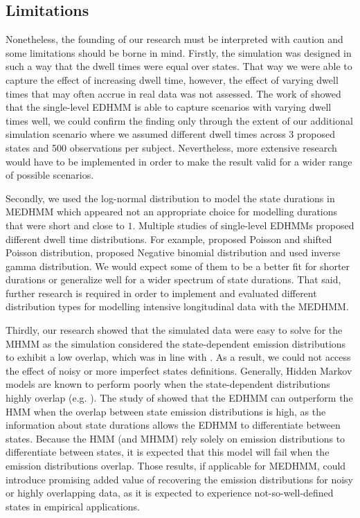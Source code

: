 \subsection{Limitations}
Nonetheless, the founding of our research must be interpreted with caution and some limitations should be borne in mind.
Firstly, the simulation was designed in such a way that the dwell times were equal over states. That way we were able to capture the effect of increasing dwell time, however, the effect of varying dwell times that may often accrue in real data was not assessed. The work of \cite{Ruiz_Suarez_2022} showed that the single-level EDHMM is able to capture scenarios with varying dwell times well, we could confirm the finding only through the extent of our additional simulation scenario where we assumed  different dwell times across 3 proposed states and 500 observations per subject. Nevertheless, more extensive research would have to be implemented in order to make the result valid for a wider range of possible scenarios. 

Secondly, we used the log-normal distribution to model the state durations in MEDHMM which appeared not an appropriate choice for modelling durations that were short and close to $1$. Multiple studies of single-level EDHMMs proposed different dwell time distributions. For example, \cite{hadjamar2022bayesian,dewar_inference_2012,LUATI2021107183} proposed Poisson and shifted Poisson distribution, \cite{hadjamar2022bayesian,POHLE2022107479} proposed Negative binomial distribution and \cite{Nagaraja_1996} used inverse gamma distribution. We would expect some of them to be a better fit for shorter durations or generalize well for a wider spectrum of state durations. That said, further research is required in order to implement and evaluated different distribution types for modelling intensive longitudinal data with the MEDHMM. 

Thirdly, our research showed that the simulated data were easy to solve for the MHMM as the simulation considered the state-dependent emission distributions to exhibit a low overlap, which was in line with \cite{McClintock_2021}. As a result, we could not access the effect of noisy or more imperfect states definitions. Generally, Hidden Markov models are known to perform poorly when the state-dependent distributions highly overlap (e.g. \cite{jonsen2016joint,Beyer_Morales_Murray_Fortin_2013}). The study of \cite{Ruiz_Suarez_2022} showed that the EDHMM can outperform the HMM when the overlap between state emission distributions is high, as the information about state durations allows the EDHMM to differentiate between states.  Because the HMM (and MHMM) rely solely on emission distributions to differentiate between states, it is expected that this model will fail when the emission distributions overlap. Those results, if applicable for MEDHMM, could introduce promising added value of recovering the emission distributions for noisy or highly overlapping data, as it is expected to experience not-so-well-defined states in empirical applications.

